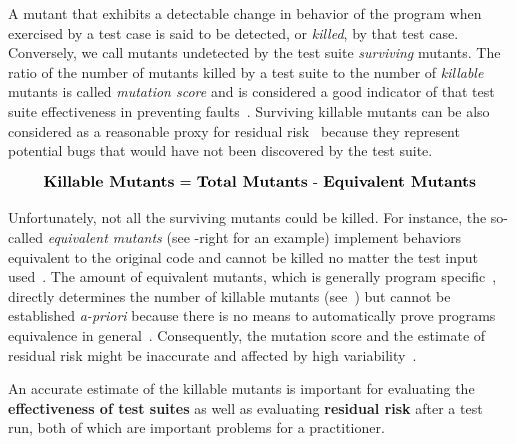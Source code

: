 \documentclass[sigconf,review,anonymous]{acmart}
\begin{document}
A mutant that exhibits a detectable change in behavior of the program when
exercised by a test case is said to be detected, or \emph{killed}, by that
test case. Conversely, we call mutants undetected by the test suite \emph{surviving} mutants.
%
The ratio of the number of mutants killed by a test suite to the 
number of \emph{killable} mutants %
is called \emph{mutation score} and  is considered a good indicator of that test suite
effectiveness in preventing faults~\cite{jia2010an}.
%
Surviving killable mutants can be also considered as
a reasonable proxy for residual risk~\cite{horgan1996software} because
they represent potential bugs that would have not been discovered by the test suite.

\vspace*{-4mm}
\begin{equation}
    \resizebox{.9\hsize}{!}{\text{\textbf{Killable Mutants}} = \text{\textbf{Total Mutants}} - \text{\textbf{Equivalent Mutants}}}
\label{eq:1}
\end{equation}

Unfortunately, not all the surviving mutants could be killed. For instance, the
so-called \emph{equivalent mutants}
(see -right for
an example) implement behaviors equivalent to the original code
and cannot be killed no matter the test input used~\cite{budd1982two}.
%
The amount of %
equivalent mutants, which is generally
program specific~\cite{offutt1994using,grun2009impact}, directly determines
the number of killable mutants (see~) but cannot be established 
\emph{a-priori} because there is no means to automatically prove programs equivalence
in general~\cite{budd1982two,rice1953classes}.
%
Consequently, the mutation score and the estimate of residual risk might be inaccurate
and affected by high variability~\cite{gotelli2011estimating}.
\begin{tcolorbox}[boxrule=0.5pt, arc=4pt, boxsep=0pt, width=\columnwidth]
An accurate estimate of the killable mutants is important for evaluating the \textbf{effectiveness
of test suites} as well as evaluating \textbf{residual risk} after a test run, both of which are important problems for a practitioner.
\end{tcolorbox}
\end{document}
